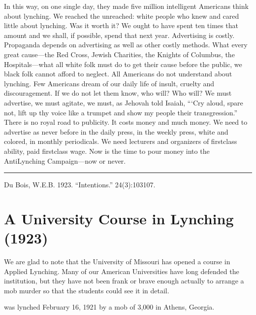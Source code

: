 \documentclass[letterpaper,10pt,english]{jupyterBook}
\begin{document}
\sphinxAtStartPar
In this way, on one single day, they made five million intelligent Americans think about lynching. We reached the unreached: white people who knew and cared little about lynching. Was it worth it? We ought to have spent ten times that amount and we shall, if possible, spend that next year. Advertising is costly. Propaganda depends on advertising as well as other
costly methods. What every great cause—the Red Cross, Jewish Charities, the Knights of Columbus, the Hospitals—what all white folk must do to get their cause before the public, we black folk cannot afford to neglect. All Americans do not understand about lynching. Few Americans dream of our daily life of insult, cruelty and discouragement. If we do not let them know, who will? Who will? We must advertise, we must agitate, we must, as Jehovah told Isaiah, “‘Cry aloud, spare not, lift up thy voice like a trumpet and show my people their transgression.” There is no royal road to publicity. It costs money and much money. We need to advertise as never before in the daily press, in the weekly press, white and colored, in monthly periodicals. We need lecturers and organizers of first\sphinxhyphen{}class ability, paid first\sphinxhyphen{}class wage. Now is the time to pour money into the Anti\sphinxhyphen{}Lynching Campaign—now or never.


\bigskip\hrule\bigskip


\sphinxAtStartPar
{} Du Bois, W.E.B. 1923. “Intentions.” 24(3):103\sphinxhyphen{}107.


\section{A University Course in Lynching (1923)}
\label{\detokenize{Volumes/26/02/university_course_in_lynching:a-university-course-in-lynching-1923}}\label{\detokenize{Volumes/26/02/university_course_in_lynching::doc}}


\sphinxAtStartPar
We are glad to note that the University of Missouri has opened a course in Applied Lynching. Many of our American Universities have long defended the institution, but they have not been frank or brave enough actually to arrange a mob murder so that the students could see it in detail.

\begin{sphinxShadowBox}
\sphinxstylesidebartitle{}

\sphinxAtStartPar
{} was lynched February 16, 1921 by a mob of 3,000 in Athens, Georgia.
\end{sphinxShadowBox}
\end{document}
